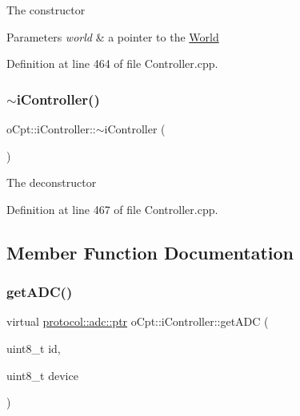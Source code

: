 The constructor 
\begin{DoxyParams}{Parameters}
{\em world} & a pointer to the \hyperlink{classo_cpt_1_1_world}{World} \\
\hline
\end{DoxyParams}


Definition at line 464 of file Controller.\+cpp.

\hypertarget{classo_cpt_1_1i_controller_aa92cd99292abf1c093cd03420f44f6a0}{}\label{classo_cpt_1_1i_controller_aa92cd99292abf1c093cd03420f44f6a0} 
\subsubsection{\texorpdfstring{$\sim$i\+Controller()}{~iController()}}
{\footnotesize\ttfamily o\+Cpt\+::i\+Controller\+::$\sim$i\+Controller (\begin{DoxyParamCaption}{ }\end{DoxyParamCaption})\hspace{0.3cm}{\ttfamily [virtual]}}

The deconstructor 

Definition at line 467 of file Controller.\+cpp.



\subsection{Member Function Documentation}
\hypertarget{classo_cpt_1_1i_controller_a7abf65f5912df117a3ff4c1c9643bba3}{}\label{classo_cpt_1_1i_controller_a7abf65f5912df117a3ff4c1c9643bba3} 
\subsubsection{\texorpdfstring{get\+A\+D\+C()}{getADC()}}
{\footnotesize\ttfamily virtual \hyperlink{classo_cpt_1_1protocol_1_1adc_a94af68cb9c573629a4a1a16f8ebd3dff}{protocol\+::adc\+::ptr} o\+Cpt\+::i\+Controller\+::get\+A\+DC (\begin{DoxyParamCaption}\item[{uint8\+\_\+t}]{id,  }\item[{uint8\+\_\+t}]{device }\end{DoxyParamCaption})\hspace{0.3cm}{\ttfamily [pure virtual]}}

